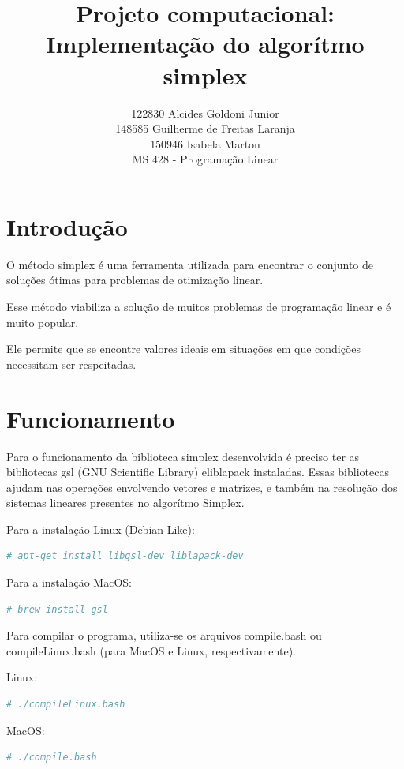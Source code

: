 \documentclass[a4paper]{article}
\title{Projeto computacional: Implementa\c{c}\~ao do algor\'itmo simplex}
\author{122830 Alcides Goldoni Junior\\
		148585 Guilherme de Freitas Laranja\\
		150946 Isabela Marton\\
	\small MS 428 - Programa\c{c}\~ao Linear\\
	}%
\begin{document}
\maketitle
\section{Introdu\c{c}\~ao}

O m\'etodo simplex \'e uma ferramenta utilizada para encontrar o conjunto de solu\c{c}\~oes \'otimas para problemas de otimiza\c{c}\~ao linear.

Esse m\'etodo viabiliza a solu\c{c}\~ao de muitos problemas de programa\c{c}\~ao linear e \'e muito popular.

Ele permite que se encontre valores ideais em situa\c{c}\~oes em que condi\c{c}\~oes necessitam ser respeitadas.

\section{Funcionamento}
Para o funcionamento da biblioteca simplex desenvolvida \'e preciso ter as bibliotecas gsl (GNU Scientific Library) eliblapack instaladas. Essas bibliotecas ajudam nas opera\c{c}\~oes envolvendo vetores e matrizes, e tamb\'em na resolu\c{c}\~ao dos sistemas lineares presentes no algor\'itmo Simplex.

Para a instala\c{c}\~ao Linux (Debian Like):
\begin{lstlisting}[language=bash]
  # apt-get install libgsl-dev liblapack-dev
\end{lstlisting}

Para a instala\c{c}\~ao MacOS:
\begin{lstlisting}[language=bash]
  # brew install gsl 
\end{lstlisting}

Para compilar o programa, utiliza-se os arquivos compile.bash ou compileLinux.bash (para MacOS e Linux, respectivamente).

Linux:
\begin{lstlisting}[language=bash]
  # ./compileLinux.bash 
\end{lstlisting}

MacOS:
\begin{lstlisting}[language=bash]
  # ./compile.bash 
\end{lstlisting}
\end{document}
